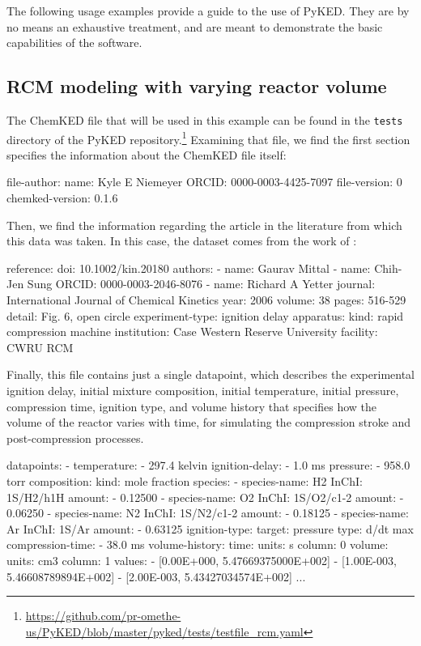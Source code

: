 \documentclass[12pt]{ijck}
\newcommand\ck{ChemKED}
\newcommand\pk{PyKED}
\begin{document}
The following usage examples provide a guide to the use of \pk{}. They are by no
means an exhaustive treatment, and are meant to demonstrate the basic
capabilities of the software.

\subsection{RCM modeling with varying reactor volume}\label{sec:rcm-modeling}

The \ck{} file that will be used in this example can be found in the
\texttt{tests} directory of the PyKED
repository.\footnote{\url{https://github.com/pr-omethe-us/PyKED/blob/master/pyked/tests/testfile_rcm.yaml}}
Examining that file, we find the first section specifies the information about
the \ck{} file itself:
%
\begin{yamlbox}
file-author:
  name: Kyle E Niemeyer
  ORCID: 0000-0003-4425-7097
file-version: 0
chemked-version: 0.1.6
\end{yamlbox}
%
Then, we find the information regarding the article in the literature from which
this data was taken. In this case, the dataset comes from the work of
\textcite{Mittal2006a}:
%
\begin{yamlbox}
reference:
  doi: 10.1002/kin.20180
  authors:
    - name: Gaurav Mittal
    - name: Chih-Jen Sung
      ORCID: 0000-0003-2046-8076
    - name: Richard A Yetter
  journal: International Journal of Chemical Kinetics
  year: 2006
  volume: 38
  pages: 516-529
  detail: Fig. 6, open circle
experiment-type: ignition delay
apparatus:
  kind: rapid compression machine
  institution: Case Western Reserve University
  facility: CWRU RCM
\end{yamlbox}
%
Finally, this file contains just a single datapoint, which describes the experimental
ignition delay, initial mixture composition, initial temperature, initial pressure,
compression time, ignition type, and volume history that specifies
how the volume of the reactor varies with time, for simulating the compression
stroke and post-compression processes.
%
\begin{yamlbox}
datapoints:
- temperature:
    - 297.4 kelvin
  ignition-delay:
    - 1.0 ms
  pressure:
    - 958.0 torr
  composition:
    kind: mole fraction
    species:
      - species-name: H2
        InChI: 1S/H2/h1H
        amount:
          - 0.12500
      - species-name: O2
        InChI: 1S/O2/c1-2
        amount:
          - 0.06250
      - species-name: N2
        InChI: 1S/N2/c1-2
        amount:
          - 0.18125
      - species-name: Ar
        InChI: 1S/Ar
        amount:
          - 0.63125
  ignition-type:
    target: pressure
    type: d/dt max
  compression-time:
    - 38.0 ms
  volume-history:
    time:
      units: s
      column: 0
    volume:
      units: cm3
      column: 1
    values:
      - [0.00E+000, 5.47669375000E+002]
      - [1.00E-003, 5.46608789894E+002]
      - [2.00E-003, 5.43427034574E+002]
      ...
\end{yamlbox}
\end{document}
